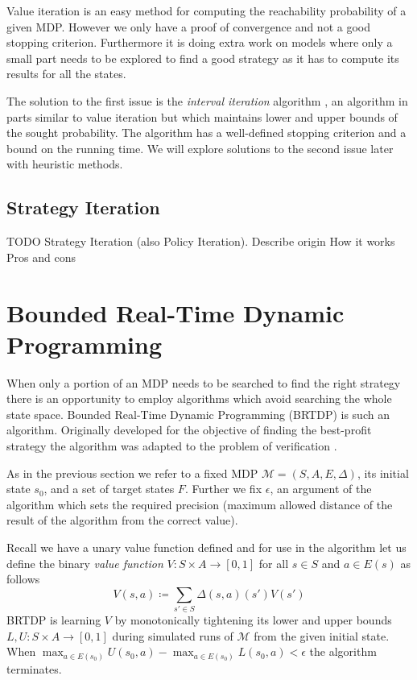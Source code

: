 Value iteration is an easy method for computing the reachability
probability of a given MDP.  However we only have a proof of convergence
and not a good stopping criterion.  Furthermore it is doing extra work
on models where only a small part needs to be explored to find a good
strategy as it has to compute its results for all the states.

The solution to the first issue is the {\em interval iteration}
algorithm \parencite{interval_iteration}, an algorithm in parts similar
to value iteration but which maintains lower and upper bounds of the
sought probability. The algorithm has a well-defined stopping criterion
and a bound on the running time.  We will explore solutions to the
second issue later with heuristic methods.


\subsection{Strategy Iteration}

TODO
Strategy Iteration (also Policy Iteration).
Describe origin
How it works
Pros and cons

\section{Bounded Real-Time Dynamic Programming}

When only a portion of an MDP needs to be searched to find the right
strategy there is an opportunity to employ algorithms which avoid
searching the whole state space. Bounded Real-Time Dynamic Programming
(BRTDP) is such an algorithm. Originally developed for
the objective of finding the best-profit strategy
\parencite{profit_brtdp} the algorithm was adapted to the problem of
verification \parencite{atva14}.

As in the previous section we refer to a fixed MDP $\mathcal{M} =
(S,A,E,\Delta)$, its initial state $s_0$, and a set of target states
$F$. Further we fix $\epsilon$, an argument of the algorithm which sets
the required precision (maximum allowed distance of the result of the
algorithm from the correct value).

Recall we have a unary value function defined
and for use in the algorithm let us define the binary {\em value function}
$V : S \times A \to [0,1]$ for all $s \in S$ and $a \in E(s)$ as follows
\[
    V(s,a) \coloneqq \sum_{s' \in S} \Delta(s,a)(s')V(s')
\]
BRTDP is learning $V$ by monotonically tightening its lower and upper
bounds $L, U : S \times A \to [0,1]$ during simulated runs of
$\mathcal{M}$ from the given initial state.
When $\max_{a \in E(s_0)} U(s_0, a) - \max_{a \in E(s_0)} L(s_0, a) < \epsilon$
the algorithm terminates.

